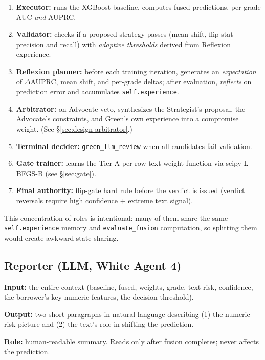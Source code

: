 \documentclass[11pt,a4paper]{article}
\begin{document}
\begin{enumerate}[itemsep=0pt]
    \item \textbf{Executor:} runs the XGBoost baseline, computes fused predictions,
          per-grade AUC \emph{and} AUPRC.
    \item \textbf{Validator:} checks if a proposed strategy passes (mean shift,
          flip-stat precision and recall) with \emph{adaptive thresholds}
          derived from Reflexion experience.
    \item \textbf{Reflexion planner:} before each training iteration, generates
          an \emph{expectation} of $\Delta$AUPRC, mean shift, and per-grade deltas;
          after evaluation, \emph{reflects} on prediction error and accumulates
          \texttt{self.experience}.
    \item \textbf{Arbitrator:} on Advocate veto, synthesizes the Strategist's
          proposal, the Advocate's constraints, and Green's own experience
          into a compromise weight. (See \S\ref{sec:design-arbitrator}.)
    \item \textbf{Terminal decider:} \texttt{green\_llm\_review} when all
          candidates fail validation.
    \item \textbf{Gate trainer:} learns the Tier-A per-row text-weight function
          via scipy L-BFGS-B (see \S\ref{sec:gate}).
    \item \textbf{Final authority:} flip-gate hard rule before the verdict is
          issued (verdict reversals require high confidence + extreme text signal).
\end{enumerate}
\noindent
This concentration of roles is intentional: many of them share the same
\texttt{self.experience} memory and \texttt{evaluate\_fusion} computation, so
splitting them would create awkward state-sharing.

\subsection{Reporter (LLM, White Agent 4)}

\noindent
\textbf{Input:} the entire context (baseline, fused, weights, grade, text
risk, confidence, the borrower's key numeric features, the decision threshold).

\noindent
\textbf{Output:} two short paragraphs in natural language describing
(1) the numeric-risk picture and (2) the text's role in shifting the prediction.

\noindent
\textbf{Role:} human-readable summary. Reads only after fusion completes;
never affects the prediction.
\end{document}
